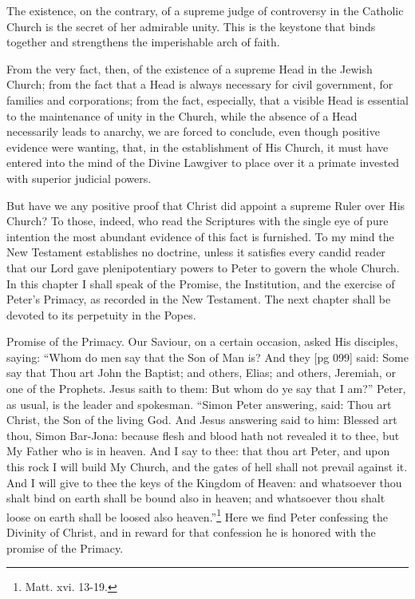 The existence, on the contrary, of a supreme
judge of controversy in the Catholic Church is
the secret of her admirable unity. This is the keystone
that binds together and strengthens the imperishable
arch of faith.

From the very fact, then, of the existence of a
supreme Head in the Jewish Church; from the
fact that a Head is always necessary for civil government,
for families and corporations; from the
fact, especially, that a visible Head is essential to
the maintenance of unity in the Church, while the
absence of a Head necessarily leads to anarchy,
we are forced to conclude, even though positive
evidence were wanting, that, in the establishment
of His Church, it must have entered into the mind
of the Divine Lawgiver to place over it a primate
invested with superior judicial powers.

But have we any positive proof that Christ did
appoint a supreme Ruler over His Church? To
those, indeed, who read the Scriptures with the
single eye of pure intention the most abundant
evidence of this fact is furnished. To my mind
the New Testament establishes no doctrine, unless
it satisfies every candid reader that our Lord
gave plenipotentiary powers to Peter to govern
the whole Church. In this chapter I shall speak
of the Promise, the Institution, and the exercise
of Peter's Primacy, as recorded in the New Testament.
The next chapter shall be devoted to its
perpetuity in the Popes.

Promise of the Primacy. Our Saviour, on a certain
occasion, asked His disciples, saying: “Whom
do men say that the Son of Man is? And they
[pg 099]
said: Some say that Thou art John the Baptist;
and others, Elias; and others, Jeremiah, or one
of the Prophets. Jesus saith to them: But whom
do ye say that I am?” Peter, as usual, is the
leader and spokesman. “Simon Peter answering,
said: Thou art Christ, the Son of the living God.
And Jesus answering said to him: Blessed art
thou, Simon Bar-Jona: because flesh and blood
hath not revealed it to thee, but My Father who
is in heaven. And I say to thee: that thou art
Peter, and upon this rock I will build My Church,
and the gates of hell shall not prevail against it.
And I will give to thee the keys of the Kingdom
of Heaven: and whatsoever thou shalt bind on
earth shall be bound also in heaven; and whatsoever
thou shalt loose on earth shall be loosed also
heaven.”\footnote{Matt. xvi.
13-19.} Here we find Peter confessing the
Divinity of Christ, and in reward for that confession
he is honored with the promise of the
Primacy.

